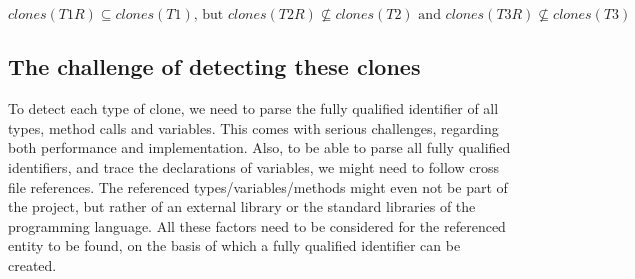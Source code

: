 \begin{equation}\label{eq:typerelation2}
clones(T1R) \subseteq clones(T1) \text{, but } clones(T2R) \nsubseteq clones(T2) \text{ and } clones(T3R) \nsubseteq clones(T3)
\end{equation}

\subsection{The challenge of detecting these clones}\label{chap:challenge}
To detect each type of clone, we need to parse the fully qualified identifier of all types, method calls and variables. This comes with serious challenges, regarding both performance and implementation. Also, to be able to parse all fully qualified identifiers, and trace the declarations of variables, we might need to follow cross file references. The referenced types/variables/methods might even not be part of the project, but rather of an external library or the standard libraries of the programming language. All these factors need to be considered for the referenced entity to be found, on the basis of which a fully qualified identifier can be created.

